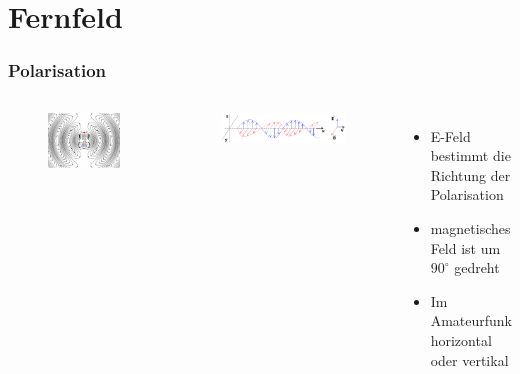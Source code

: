 \section*{Fernfeld}

\begin{frame}
  \frametitle{Polarisation}
    \begin{columns}
      \begin{figure}
        \includegraphics[width=1\textwidth,height=.7\textheight,keepaspectratio]{e08/Dipole_xmting_antenna_animation_4_408x318x150ms-2.png}
      \end{figure}
      \begin{figure}
        \includegraphics[width=\textwidth,height=.4\textheight,keepaspectratio]{e08/Onde_electromagnetique.png}
      \end{figure}
      \begin{itemize}
        \item E-Feld bestimmt die Richtung der Polarisation
        \item magnetisches Feld ist um $90^\circ$ gedreht
        \item Im Amateurfunk horizontal oder vertikal
      \end{itemize}
    \end{columns}
\end{frame}

